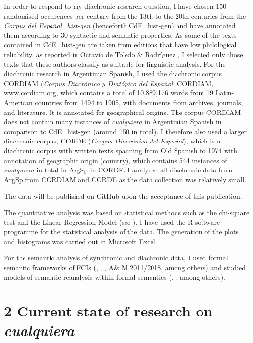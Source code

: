 \documentclass[output=paper]{langscibook}
\begin{document}
  In order to respond to my diachronic research question, I have chosen 150 randomised occurences per century from the 13th to the 20th centuries from the \textit{Corpus del Español\_hist-gen} (henceforth CdE\_hist-gen) and have annotated them according to 30 syntactic and semantic properties. As some of the texts contained in CdE\_hist-gen are taken from editions that have low philological reliability, as reported in Octavio de Toledo \& Rodríguez \citet{Molina2017}, I selected only those texts that these authors classify as suitable for linguistic analysis. For the diachronic research in Argentinian Spanish, I used the diachronic corpus CORDIAM (\textit{Corpus Diacrónico y Diatópico del Español}, CORDIAM, www.cordiam.org, which contains a total of 10,889,176 words from 19 Latin-American countries from 1494 to 1905, with documents from archives, journals, and literature. It is annotated for geographical origins. The corpus CORDIAM does not contain many instances of \textit{cualquiera} in Argentinian Spanish in comparison to CdE\_hist-gen (around 150 in total). I therefore also used a larger diachronic corpus, CORDE (\textit{Corpus Diacrónico del Español}), which is a diachronic corpus with written texts spanning from Old Spanish to 1974 with annotation of geographic origin (country), which contains 544 instances of \textit{cualquiera} in total in ArgSp in CORDE. I analysed all diachronic data from ArgSp from CORDIAM and CORDE as the data collection was relatively small. 

  The data will be published on GitHub upon the acceptance of this publication.

  The quantitative analysis was based on statistical methods such as the chi-square test and the Linear Regression Model (see \citealt{Baayen2006}). I have used the R software programme for the statistical analysis of the data. The generation of the plots and histograms was carried out in Microsoft Excel. 

  For the semantic analysis of synchronic and diachronic data, I used formal semantic frameworks of FCIs (\citealt{Chierchia2006}, \citealt{Aloni2021}, \citealt{AloniPort2013}, A\& M 2011/2018, among others) and studied models of semantic reanalysis within formal semantics (\citealt{Eckardt2006}, \citealt{AloniPort2013}, among others).

\section{\textbf{2} \textbf{Current} \textbf{state} \textbf{of} \textbf{research} \textbf{on} \textbf{\textit{cualquiera}}}
\end{document}
